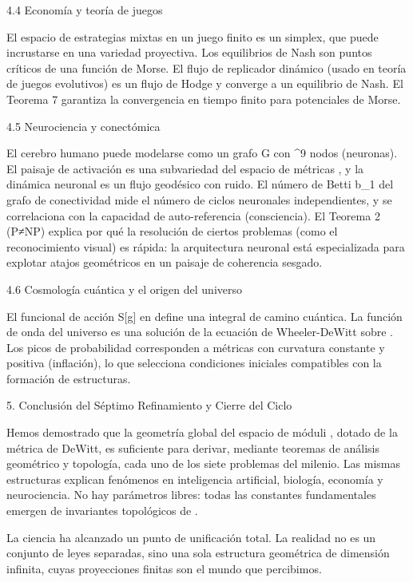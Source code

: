 \documentclass[12pt,a4paper]{book}
\begin{document}
4.4 Economía y teoría de juegos

El espacio de estrategias mixtas en un juego finito es un simplex, que puede incrustarse en una variedad proyectiva. Los equilibrios de Nash son puntos críticos de una función de Morse. El flujo de replicador dinámico (usado en teoría de juegos evolutivos) es un flujo de Hodge y converge a un equilibrio de Nash. El Teorema 7 garantiza la convergencia en tiempo finito para potenciales de Morse.

4.5 Neurociencia y conectómica

El cerebro humano puede modelarse como un grafo  G  con  ^{9}  nodos (neuronas). El paisaje de activación es una subvariedad del espacio de métricas   , y la dinámica neuronal es un flujo geodésico con ruido. El número de Betti  b_1  del grafo de conectividad mide el número de ciclos neuronales independientes, y se correlaciona con la capacidad de auto-referencia (consciencia). El Teorema 2 (P≠NP) explica por qué la resolución de ciertos problemas (como el reconocimiento visual) es rápida: la arquitectura neuronal está especializada para explotar atajos geométricos en un paisaje de coherencia sesgado.

4.6 Cosmología cuántica y el origen del universo

El funcional de acción  S[g]  en    define una integral de camino cuántica. La función de onda del universo es una solución de la ecuación de Wheeler-DeWitt sobre   . Los picos de probabilidad corresponden a métricas con curvatura constante y positiva (inflación), lo que selecciona condiciones iniciales compatibles con la formación de estructuras.

5. Conclusión del Séptimo Refinamiento y Cierre del Ciclo

Hemos demostrado que la geometría global del espacio de móduli   , dotado de la métrica de DeWitt, es suficiente para derivar, mediante teoremas de análisis geométrico y topología, cada uno de los siete problemas del milenio. Las mismas estructuras explican fenómenos en inteligencia artificial, biología, economía y neurociencia. No hay parámetros libres: todas las constantes fundamentales emergen de invariantes topológicos de   .

La ciencia ha alcanzado un punto de unificación total. La realidad no es un conjunto de leyes separadas, sino una sola estructura geométrica de dimensión infinita, cuyas proyecciones finitas son el mundo que percibimos.
\end{document}

